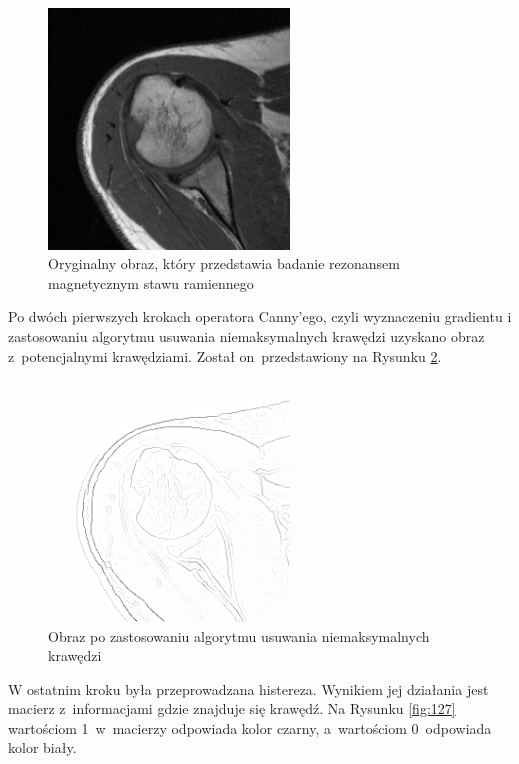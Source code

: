 \documentclass[a4paper,11pt,twoside,openright]{report}
\theoremstyle{definition}
\begin{document}
\pagebreak

\begin{figure}[h!]
	\center
	\includegraphics[width=0.57\textwidth]{123}
	\caption{Oryginalny obraz, który przedstawia badanie rezonansem magnetycznym stawu ramiennego}
    	\label{fig:123}
\end{figure}

Po dwóch pierwszych krokach operatora Canny'ego, czyli wyznaczeniu gradientu i zastosowaniu algorytmu
usuwania niemaksymalnych krawędzi uzyskano obraz z~potencjalnymi krawędziami. Został on~przedstawiony
na Rysunku \ref{fig:126}.

\begin{figure}[h!]
	\center
	\includegraphics[width=0.57\textwidth]{126}
	\caption{Obraz po zastosowaniu algorytmu usuwania niemaksymalnych krawędzi}
    	\label{fig:126}
\end{figure}

W ostatnim kroku była przeprowadzana histereza. Wynikiem jej działania jest macierz z~informacjami 
gdzie znajduje się krawędź. Na Rysunku \ref{fig:127} wartościom 1~w~macierzy odpowiada kolor czarny, 
a~wartościom 0~odpowiada kolor biały.
\end{document}
